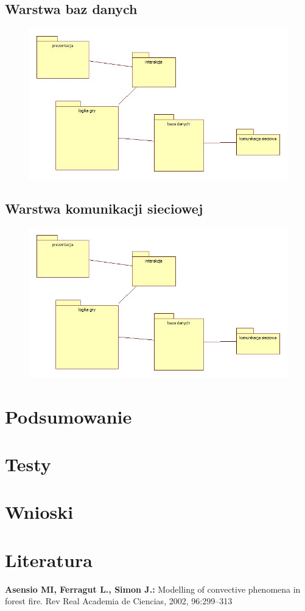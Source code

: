 \documentclass[a4paper, 11pt]{article}
\begin{document}
	\subsection{Warstwa baz danych}	
	\begin{figure}[H]%
		\includegraphics[scale=0.5]{uml/main.jpg}
	\end{figure}
	\subsection{Warstwa komunikacji sieciowej}
	\begin{figure}[H]%
		\includegraphics[scale=0.5]{uml/main.jpg}
	\end{figure}	
	
	
	
	\section{Podsumowanie}
	

	\section{Testy}
	

	\section{Wnioski}
	

	\section{Literatura}
	
\textbf{Asensio MI, Ferragut L., Simon J.:} Modelling of convective phenomena in forest fire. Rev Real Academia de Ciencias, 2002, 96:299–313\\
\end{document}
